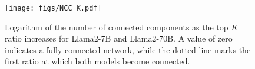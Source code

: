 \begin{figure}
    \centering
    \texttt{[image: figs/NCC\_K.pdf]}
    \caption{Logarithm of the number of connected components as the top $K$ ratio increases for Llama2-7B and Llama2-70B. A value of zero indicates a fully connected network, while the dotted line marks the first ratio at which both models become connected.}
    \label{fig:K_ratio}
\end{figure}




